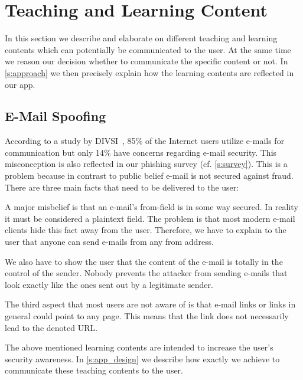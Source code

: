 \section{Teaching and Learning Content}

In this section we describe and elaborate on different teaching and learning contents which can potentially be communicated to the user.
 At the same time we reason our decision whether to communicate the specific content or not.
In \autoref{s:approach} we then precisely explain how the learning contents are reflected in our app.

\subsection{E-Mail Spoofing}
According to a study by DIVSI~\cite{divsi2012divsi}, 85\% of the Internet users utilize e-mails for communication but only 14\% have concerns regarding e-mail security.
This misconception is also reflected in our phishing survey (cf. \autoref{s:survey}).
This is a problem because in contrast to public belief e-mail is not secured against fraud. There are three main facts that need to be delivered to the user:
\begin{description}[leftmargin=0cm]
	\item[From Field:] A major misbelief is that an e-mail's from-field is in some way secured.
	In reality it must be considered a plaintext field.
	The problem is that most modern e-mail clients hide this fact away from the user.
	Therefore, we have to explain to the user that anyone can send e-mails from any from address. 
	\item[E-Mail Content:] We also have to show the user that the content of the e-mail is totally in the control of the sender.
	Nobody prevents the attacker from sending e-mails that look exactly like the ones sent out by a legitimate sender.
	\item[Links in E-Mails:] The third aspect that most users are not aware of is that e-mail links or links in general could point to any page. 
	This means that the link does not necessarily lead to the denoted URL.
\end{description}

The above mentioned learning contents are intended to increase the user's security awareness.
In \autoref{s:app_design} we describe how exactly we achieve to communicate these teaching contents to the user.

